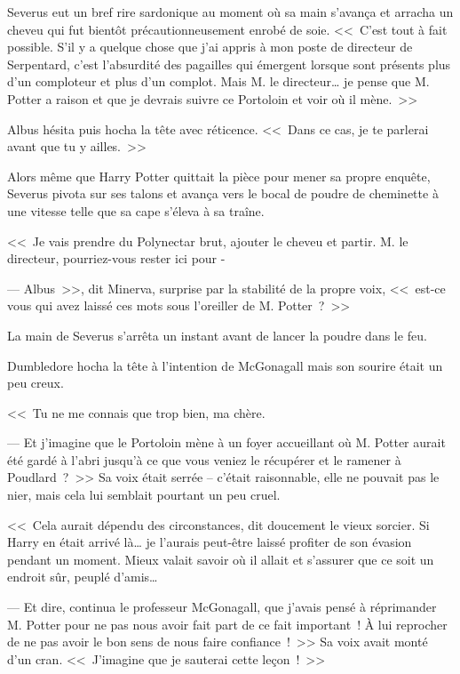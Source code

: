 Severus eut un bref rire sardonique au moment où sa main s'avança et arracha un cheveu qui fut bientôt précautionneusement enrobé de soie. <<~C'est tout à fait possible. S'il y a quelque chose que j'ai appris à mon poste de directeur de Serpentard, c'est l'absurdité des pagailles qui émergent lorsque sont présents plus d'un comploteur et plus d'un complot. Mais M. le directeur… je pense que M. Potter a raison et que je devrais suivre ce Portoloin et voir où il mène.~>>

Albus hésita puis hocha la tête avec réticence. <<~Dans ce cas, je te parlerai avant que tu y ailles.~>>

\later

Alors même que Harry Potter quittait la pièce pour mener sa propre enquête, Severus pivota sur ses talons et avança vers le bocal de poudre de cheminette à une vitesse telle que sa cape s'éleva à sa traîne.

<<~Je vais prendre du Polynectar brut, ajouter le cheveu et partir. M. le directeur, pourriez-vous rester ici pour -

--- Albus~>>, dit Minerva, surprise par la stabilité de la propre voix, <<~est-ce vous qui avez laissé ces mots sous l'oreiller de M. Potter~?~>>

La main de Severus s'arrêta un instant avant de lancer la poudre dans le feu.

Dumbledore hocha la tête à l'intention de McGonagall mais son sourire était un peu creux.

<<~Tu ne me connais que trop bien, ma chère.

--- Et j'imagine que le Portoloin mène à un foyer accueillant où M. Potter aurait été gardé à l'abri jusqu'à ce que vous veniez le récupérer et le ramener à Poudlard~?~>> Sa voix était serrée -- c'était raisonnable, elle ne pouvait pas le nier, mais cela lui semblait pourtant un peu cruel.

<<~Cela aurait dépendu des circonstances, dit doucement le vieux sorcier. Si Harry en était arrivé là… je l'aurais peut-être laissé profiter de son évasion pendant un moment. Mieux valait savoir où il allait et s'assurer que ce soit un endroit sûr, peuplé d'amis…

--- Et dire, continua le professeur McGonagall, que j'avais pensé à réprimander M. Potter pour ne pas nous avoir fait part de ce fait important~! À lui reprocher de ne pas avoir le bon sens de nous faire confiance~!~>> Sa voix avait monté d'un cran. <<~J'imagine que je sauterai cette leçon~!~>>


